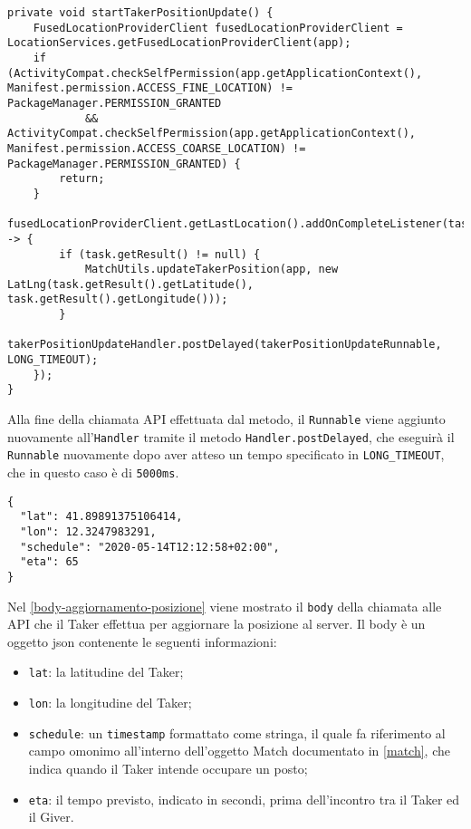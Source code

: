 \begin{lstlisting}[caption=Metodo per l'invio della posizione del Taker al server,  label=invio-posizione-taker]
private void startTakerPositionUpdate() {
    FusedLocationProviderClient fusedLocationProviderClient = LocationServices.getFusedLocationProviderClient(app);
    if (ActivityCompat.checkSelfPermission(app.getApplicationContext(), Manifest.permission.ACCESS_FINE_LOCATION) != PackageManager.PERMISSION_GRANTED
            && ActivityCompat.checkSelfPermission(app.getApplicationContext(), Manifest.permission.ACCESS_COARSE_LOCATION) != PackageManager.PERMISSION_GRANTED) {
        return;
    }
    fusedLocationProviderClient.getLastLocation().addOnCompleteListener(task -> {
        if (task.getResult() != null) {
            MatchUtils.updateTakerPosition(app, new LatLng(task.getResult().getLatitude(), task.getResult().getLongitude()));
        }
        takerPositionUpdateHandler.postDelayed(takerPositionUpdateRunnable, LONG_TIMEOUT);
    });
}
\end{lstlisting}

Alla fine della chiamata API effettuata dal metodo, il \texttt{Runnable} viene aggiunto nuovamente all'\texttt{Handler} tramite il metodo \texttt{Handler.postDelayed}, che eseguirà il \texttt{Runnable} nuovamente dopo aver atteso un tempo specificato in \texttt{LONG\_TIMEOUT}, che in questo caso è di \texttt{5000ms}.

\begin{lstlisting}[caption=Body della chiamata alle API per l'aggiornamento della posizione del Taker, label=body-aggiornamento-posizione]
{
  "lat": 41.89891375106414,
  "lon": 12.3247983291,
  "schedule": "2020-05-14T12:12:58+02:00",
  "eta": 65
}
\end{lstlisting}

Nel \autoref{body-aggiornamento-posizione} viene mostrato il \texttt{body} della chiamata alle API che il Taker effettua per aggiornare la posizione al server. Il body è un oggetto json contenente le seguenti informazioni:
\begin{itemize}
\item
  \texttt{lat}: la latitudine del Taker;
\item
  \texttt{lon}: la longitudine del Taker;
\item
  \texttt{schedule}: un \texttt{timestamp} formattato come stringa, il quale fa riferimento al campo omonimo all'interno dell'oggetto Match documentato in \autoref{match}, che indica quando il Taker intende  occupare un posto;
\item
  \texttt{eta}: il tempo previsto, indicato in secondi, prima dell'incontro tra il Taker ed il Giver.
\end{itemize}

